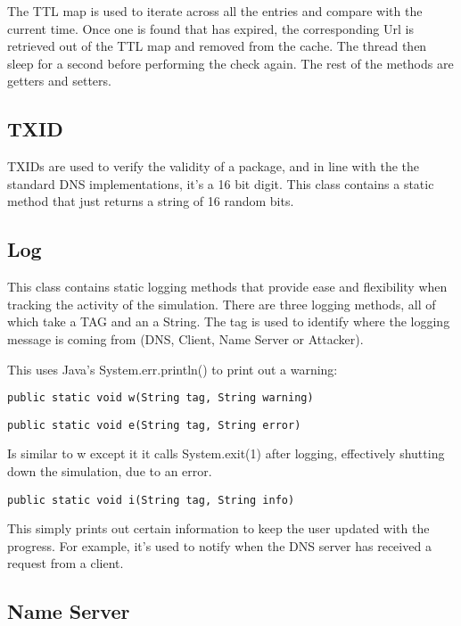 \documentclass[a4paper, 12pt]{article} %
\begin{document}
The TTL map is used to iterate across all the entries and compare with the current time. Once one is found that has expired, the corresponding Url is retrieved out of the TTL map and removed from the cache. The thread then sleep for a second before performing the check again. The rest of the methods are getters and setters. 

\subsection*{TXID}

TXIDs are used to verify the validity of a package, and in line with the the standard DNS implementations, it’s a 16 bit digit. This class contains a static method that just returns a string of 16 random bits.  

\subsection*{Log}

This class contains static logging methods that provide ease and flexibility when tracking the activity of the simulation. There are three logging methods, all of which take a TAG and an a String. The tag is used to identify where the logging message is coming from (DNS, Client, Name Server or Attacker).

This uses Java's System.err.println() to print out a warning:

\begin{lstlisting}
public static void w(String tag, String warning)
\end{lstlisting}

\begin{lstlisting}
public static void e(String tag, String error) 
\end{lstlisting}

Is similar to w except it it calls System.exit(1) after logging, effectively shutting down the simulation, due to an error. 
\begin{lstlisting}
public static void i(String tag, String info) 
\end{lstlisting}

This simply prints out certain information to keep the user updated with the progress. For example, it’s used to notify when the DNS server has received a request from a client. 


\subsection*{Name Server}
\end{document}
